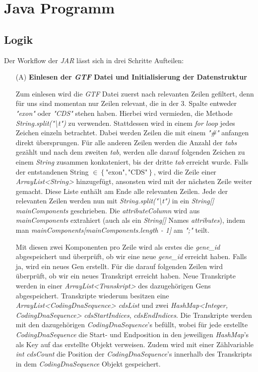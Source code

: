 \documentclass[12pt]{article}
\begin{document}
\section{Java Programm}
\subsection{Logik}\label{sec:logik}
Der Workflow der \textit{JAR} lässt sich in drei Schritte Aufteilen:
\begin{enumerate}
	\item[(A)] \textbf{Einlesen der \textit{GTF} Datei und Initialisierung der Datenstruktur}

		Zum einlesen wird die \textit{GTF} Datei zuerst nach relevanten Zeilen gefiltert, denn
		für uns sind momentan nur Zeilen relevant, die in der 3. Spalte entweder
		\textit{"exon"} oder \textit{"CDS"} stehen haben. Hierbei wird vermieden,
		die Methode \textit{String.split("\textbackslash t")} zu verwenden.
		Stattdessen wird in einem \textit{for loop} jedes Zeichen einzeln betrachtet.
		Dabei werden Zeilen die mit einem \textit{"\#"} anfangen direkt übersprungen.
		Für alle anderen Zeilen werden die Anzahl der \textit{tabs} gezählt und nach
		dem zweiten \textit{tab}, werden alle darauf folgenden Zeichen zu einem
		\textit{String} zusammen konkateniert, bis der dritte \textit{tab}
		erreicht wurde. Falls der entstandenen String $\in \left\{\text{"exon"}, \text{"CDS"} \right\}$, wird die
		Zeile einer \textit{ArrayList<String>} hinzugefügt, ansonsten wird mit der nächsten Zeile weiter gemacht.
		Diese Liste enthält am Ende alle relevanten Zeilen.
		Jede der relevanten Zeilen werden nun mit \textit{String.split("\textbackslash t")} in
		ein \textit{String[] mainComponents} geschrieben. Die \textit{attributeColumn} wird aus
		\textit{mainComponents} extrahiert (auch als ein \textit{String[]} Names \textit{attributes}),
		indem man \textit{mainComponents[mainComponents.length - 1]} am \textit{";"} teilt.

		Mit diesen zwei Komponenten pro Zeile wird als erstes die \textit{gene\_id} abgespeichert
		und überprüft, ob wir eine neue \textit{gene\_id} erreicht haben.
		Falls ja, wird ein neues Gen erstellt. Für die darauf folgenden Zeilen wird überprüft,
		ob wir ein neues Transkript erreicht haben. Neue Transkripte werden in einer
		\textit{ArrayList<Transkript>} des dazugehörigen Gens abgespeichert.
		Transkripte wiederum besitzen eine \textit{ArrayList<CodingDnaSequence> cdsList} und zwei
		\textit{HashMap<Integer, CodingDnaSequence>} \textit{cdsStartIndices}, \textit{cdsEndIndices}. Die Transkripte werden mit den dazugehörigen
		\textit{CodingDnaSequence}'s befüllt, wobei für jede erstellte \textit{CodingDnaSequence} die Start- und
		Endposition in den jeweiligen \textit{HashMap}'s als Key auf das erstellte Objekt verweisen.
		Zudem wird mit einer Zählvariable \textit{int cdsCount} die Position der \textit{CodingDnaSequence}'s
		innerhalb des Transkripts in dem \textit{CodingDnaSequence} Objekt gespeichert.


\end{enumerate}
\end{document}
